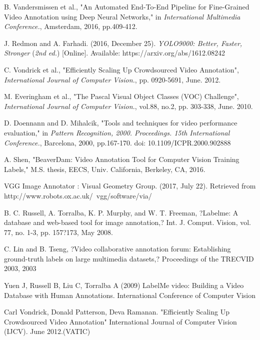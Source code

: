 \documentclass[conference]{IEEEtran}
\begin{document}
\begin{thebibliography}{9}

B. Vandersmissen et al., "An Automated End-To-End Pipeline for Fine-Grained Video Annotation using Deep Neural Networks," in 
\textit{International Multimedia Conference.}, Amsterdam, 2016, pp.409-412.
 
J. Redmon and A. Farhadi. (2016, December 25). 
\textit{YOLO9000: Better, Faster, Stronger} (\textit{2nd ed.}) [Online]. Available: https://arxiv.org/abs/1612.08242

C. Vondrick et al., "Efficiently Scaling Up Crowdsourced Video Annotation", \textit{International Journal of Computer Vision.}, pp. 0920-5691, June. 2012.

M. Everingham et al., "The Pascal Visual Object Classes (VOC) Challenge", \textit{International Journal of Computer Vision.}, vol.88, no.2, pp. 303-338, June. 2010.

D. Doennann and D. Mihalcik, "Tools and techniques for video performance evaluation," in 
\textit{Pattern Recognition, 2000. Proceedings. 15th International Conference.}, Barcelona, 2000, pp.167-170. doi: 10.1109/ICPR.2000.902888
    
A. Shen, "BeaverDam: Video Annotation Tool for Computer Vision Training Labels," M.S. thesis, EECS, Univ. California, Berkeley, CA, 2016.

VGG Image Annotator : Visual Geometry Group. (2017, July 22). Retrieved from http://www.robots.ox.ac.uk/~vgg/software/via/

B. C. Russell, A. Torralba, K. P. Murphy, and W. T. Freeman, ?Labelme: A database and web-based tool for image annotation,? Int. J. Comput. Vision, vol. 77, no. 1-3, pp. 157?173, May 2008.

C. Lin and B. Tseng, ?Video collaborative annotation forum: Establishing ground-truth labels on large multimedia datasets,? Proceedings of the TRECVID 2003, 2003

Yuen J, Russell B, Liu C, Torralba A (2009) LabelMe video: Building a Video Database with Human Annotations. International Conference of Computer Vision

Carl Vondrick, Donald Patterson, Deva Ramanan. "Efficiently Scaling Up
Crowdsourced Video Annotation" International Journal of Computer Vision
(IJCV). June 2012.(VATIC)


\end{thebibliography}
\end{document}
